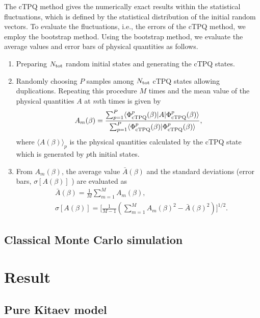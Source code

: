 \documentclass[reprint,amsmath,amssymb,aps,prx]{revtex4-2}
\begin{document}
The cTPQ method gives the numerically exact
results within the statistical fluctuations,
which is defined by the statistical distribution of the initial random vectors.
To evaluate the fluctuations, i.e., the errors of the cTPQ method, 
we employ the bootstrap method.
Using the bootstrap method,
we evaluate the average values and 
error bars of physical quantities as follows.
\begin{enumerate}
\item Preparing $N_{\rm tot}$ random initial states and generating the cTPQ states.
\item Randomly choosing $P$ samples among $N_{\rm tot}$ cTPQ states allowing duplications. 
Repeating this procedure $M$ times and the mean value of the physical quantities $A$ 
at $m$th times is given by 
\begin{align}
A_{m}(\beta) = \frac{\sum_{p=1}^{P}\langle \Phi_{\rm cTPQ}^{p}(\beta)|A|\Phi_{\rm cTPQ}^{p}(\beta)\rangle}{\sum_{p=1}^{P}\langle \Phi_{\rm cTPQ}^{p}(\beta)|\Phi_{\rm cTPQ}^{p}(\beta)\rangle},
\end{align}
where $\langle A(\beta)\rangle_{p}$ is the physical quantities calculated by the cTPQ state 
which is generated by $p$th initial states.
\item From $A_{m}(\beta)$, the 
average value $\bar{A}(\beta)$
and the standard deviations (error bars, $\sigma[A(\beta)]$ ) are 
evaluated as
\begin{align}
&\bar{A}(\beta) = \frac{1}{M}\sum_{m=1}^{M}A_{m}(\beta), \\
&\sigma[A(\beta)] = \Big[\frac{1}{M-1}(\sum_{m=1}^{M}A_{m}(\beta)^2-\bar{A}(\beta)^2)\Big]^{1/2}.
\end{align}
\end{enumerate}
  \subsection{Classical Monte Carlo simulation}


\section{Result}
  \subsection{Pure Kitaev model}
\end{document}
